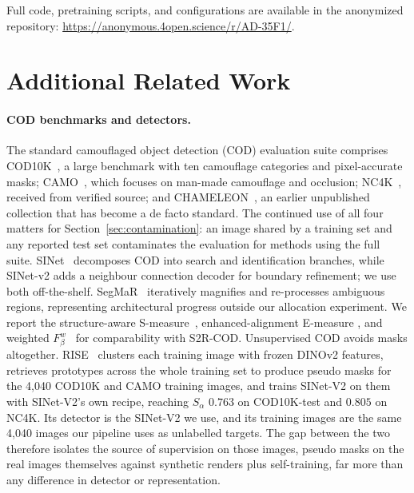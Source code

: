 \documentclass{article}
\begin{document}
Full code, pretraining scripts, and configurations are available in the anonymized repository: \url{https://anonymous.4open.science/r/AD-35F1/}.




\appendix

\section{Additional Related Work}
\label{app:related}

\paragraph{COD benchmarks and detectors.}
The standard camouflaged object detection (COD) evaluation suite comprises COD10K~\citep{fan2022concealed}, a large benchmark
with ten camouflage categories and pixel-accurate masks; CAMO~\citep{le2019anabranch}, which focuses
on man-made camouflage and occlusion; NC4K~\citep{lv2021simultaneously}, received from verified source; and
CHAMELEON~\citep{skurowski2018animal}, an earlier unpublished collection that has become a de facto
standard. The continued use of all four matters for Section~\ref{sec:contamination}: an image shared by a training set and any reported test set contaminates the evaluation for methods using the full suite.
SINet~\citep{fan2020sinet} decomposes COD into search and identification branches, while SINet-v2
\citep{fan2022concealed} adds a neighbour connection decoder for boundary refinement; we use both
off-the-shelf. SegMaR~\citep{jia2022segment} iteratively magnifies and re-processes ambiguous
regions, representing architectural progress outside our allocation experiment. We report the
structure-aware S-measure~\citep{fan2017structure}, enhanced-alignment E-measure
\citep{fan2018enhanced}, and weighted $F_\beta^w$~\citep{margolin2014evaluate} for comparability
with S2R-COD.
Unsupervised COD avoids masks altogether. RISE~\citep{du2025rise} clusters each training image with frozen DINOv2
features, retrieves prototypes across the whole training set to produce pseudo masks for the 4,040 COD10K and CAMO
training images, and trains SINet-V2 on them with SINet-V2's own recipe, reaching $S_\alpha$ $0.763$ on COD10K-test
and $0.805$ on NC4K. Its detector is the SINet-V2 we use, and its training images are the same 4,040 images our
pipeline uses as unlabelled targets. The gap between the two therefore isolates the source of supervision on those
images, pseudo masks on the real images themselves against synthetic renders plus self-training, far more than any
difference in detector or representation.
\end{document}
